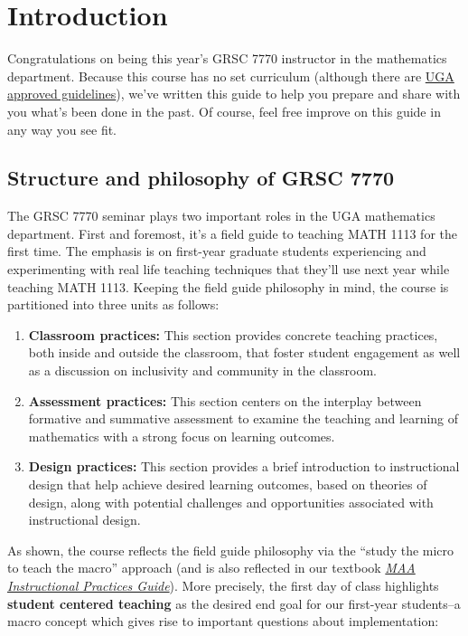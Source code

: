 
\section{Introduction}
\label{sec:introduction}

Congratulations on being this year's GRSC 7770 instructor in the mathematics department.  Because this course has no set curriculum (although there are \href{https://github.com/WilliamOlsen/GRSC-2018/blob/master/Lectures/Week-0/GRSC7770-Guidelines-2018.pdf}{UGA approved guidelines}), we've written this guide to help you prepare and share with you what's been done in the past.  Of course, feel free improve on this guide in any way you see fit.

\subsection{Structure and philosophy of GRSC 7770}
\label{sec:structure-course}

The GRSC 7770 seminar plays two important roles in the UGA mathematics department.  First and foremost, it's a field guide to teaching MATH 1113 for the first time.  The emphasis is on first-year graduate students experiencing and experimenting with real life teaching techniques that they'll use next year while teaching MATH 1113.  Keeping the field guide philosophy in mind, the course is partitioned into three units as follows:

\begin{enumerate}
\item \textbf{Classroom practices:}  This section provides concrete teaching practices, both inside and outside the classroom, that foster student engagement as well as a discussion on inclusivity and community in the classroom.
\item \textbf{Assessment practices:} This section centers on the interplay between formative and summative assessment to examine the teaching and learning of mathematics with a strong focus on learning outcomes.
\item \label{itm:DP} \textbf{Design practices:} This section provides a brief introduction to instructional design that help achieve desired learning outcomes, based on theories of design, along with potential challenges and opportunities associated with instructional design.
\end{enumerate}

As shown, the course reflects the field guide philosophy via the ``study the micro to teach the macro'' approach (and is also reflected in our textbook \href{https://www.maa.org/sites/default/files/InstructPracGuide_web.pdf}{\emph{MAA Instructional Practices Guide}}).  More precisely, the first day of class highlights \textbf{student centered teaching} as the desired end goal for our first-year students--a macro concept which gives rise to important questions about implementation:

